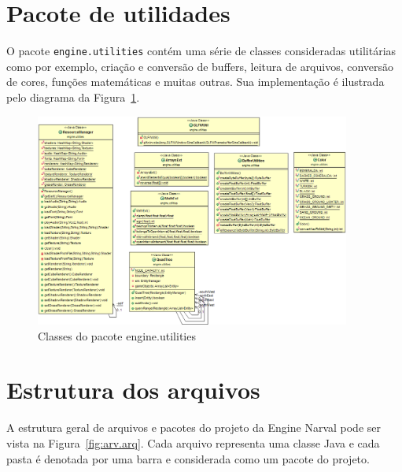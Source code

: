 \documentclass[12pt, 
openright, 
oneside, 
a4paper,    
brazil]{facom-ufu-abntex2}
\begin{document}
\section{Pacote de utilidades}

O pacote \texttt{engine.utilities} contém uma série de classes consideradas utilitárias como por exemplo, criação e conversão de buffers, leitura de arquivos, conversão de cores, funções matemáticas e muitas outras. Sua implementação é ilustrada pelo diagrama da Figura~\ref{fig:engine.utilities}.

\begin{figure}[H]
	\centering
	\includegraphics[width=28em]{imagens/engine.utilities.png}
	\caption{Classes do pacote engine.utilities}
	\label{fig:engine.utilities}
\end{figure}

\section{Estrutura dos arquivos}
A estrutura geral de arquivos e pacotes do projeto da Engine Narval pode ser vista na Figura~\ref{fig:arv.arq}. Cada arquivo representa uma classe Java e cada pasta é denotada por uma barra e considerada como um pacote do projeto.
\end{document}
